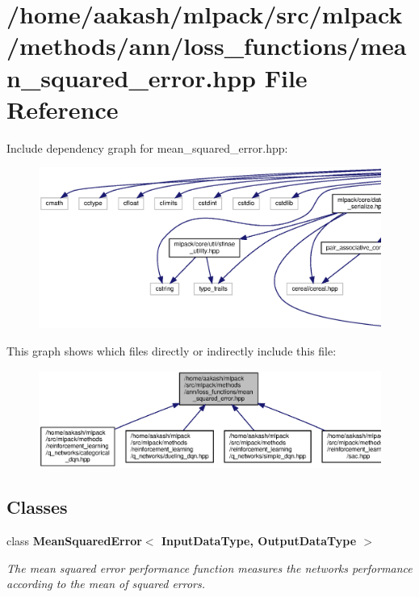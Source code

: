 \section{/home/aakash/mlpack/src/mlpack/methods/ann/loss\+\_\+functions/mean\+\_\+squared\+\_\+error.hpp File Reference}
\label{mean__squared__error_8hpp}
Include dependency graph for mean\+\_\+squared\+\_\+error.\+hpp\+:
\nopagebreak
\begin{figure}[H]
\begin{center}
\leavevmode
\includegraphics[width=350pt]{mean__squared__error_8hpp__incl}
\end{center}
\end{figure}
This graph shows which files directly or indirectly include this file\+:
\nopagebreak
\begin{figure}[H]
\begin{center}
\leavevmode
\includegraphics[width=350pt]{mean__squared__error_8hpp__dep__incl}
\end{center}
\end{figure}
\subsection*{Classes}
\begin{DoxyCompactItemize}
\item 
class \textbf{ Mean\+Squared\+Error$<$ Input\+Data\+Type, Output\+Data\+Type $>$}
\begin{DoxyCompactList}\small\item\em The mean squared error performance function measures the network\textquotesingle{}s performance according to the mean of squared errors. \end{DoxyCompactList}\end{DoxyCompactItemize}
